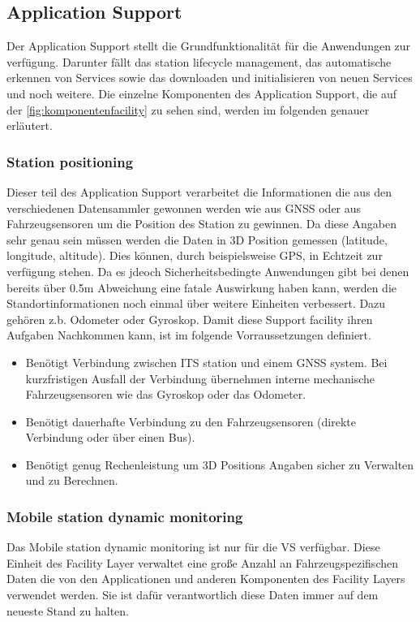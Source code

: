\subsection{Application Support}
Der Application Support stellt die Grundfunktionalität für die Anwendungen zur verfügung. Darunter fällt das station lifecycle management, das automatische erkennen von Services sowie das downloaden und initialisieren von neuen Services und noch weitere. Die einzelne Komponenten des Application Support, die auf der \autoref{fig:komponentenfacility} zu sehen sind, werden im folgenden genauer erläutert. 

\subsubsection{Station positioning}
Dieser teil des Application Support verarbeitet die Informationen die aus den verschiedenen Datensammler gewonnen werden wie aus GNSS oder aus Fahrzeugsensoren um die Position des Station zu gewinnen. 
Da diese Angaben sehr genau sein müssen werden die Daten in 3D Position gemessen (latitude, longitude, altitude). Dies können, durch beispielsweise GPS, in Echtzeit zur verfügung stehen. Da es jdeoch Sicherheitsbedingte Anwendungen gibt bei denen bereits über 0.5m Abweichung eine fatale Auswirkung haben kann, werden die Standortinformationen noch einmal über weitere Einheiten verbessert. Dazu gehören z.b. Odometer oder Gyroskop.
Damit diese Support facility ihren Aufgaben Nachkommen kann, ist im \cite{etsi102638} folgende Vorraussetzungen definiert.

\begin{itemize}
\item Benötigt Verbindung zwischen ITS station und einem GNSS system. Bei kurzfristigen Ausfall der Verbindung übernehmen interne mechanische Fahrzeugsensoren wie das Gyroskop oder das Odometer.
\item Benötigt dauerhafte Verbindung zu den Fahrzeugsensoren (direkte Verbindung oder über einen Bus).
\item Benötigt genug Rechenleistung um 3D Positions Angaben sicher zu Verwalten und zu Berechnen.
\end{itemize}

\subsubsection{Mobile station dynamic monitoring}
Das Mobile station dynamic monitoring ist nur für die \acs{VS} verfügbar. Diese Einheit des Facility Layer verwaltet eine große Anzahl an Fahrzeugspezifischen Daten die von den Applicationen und anderen Komponenten des Facility Layers verwendet werden. Sie ist dafür verantwortlich diese Daten immer auf dem neueste  Stand zu halten. 

